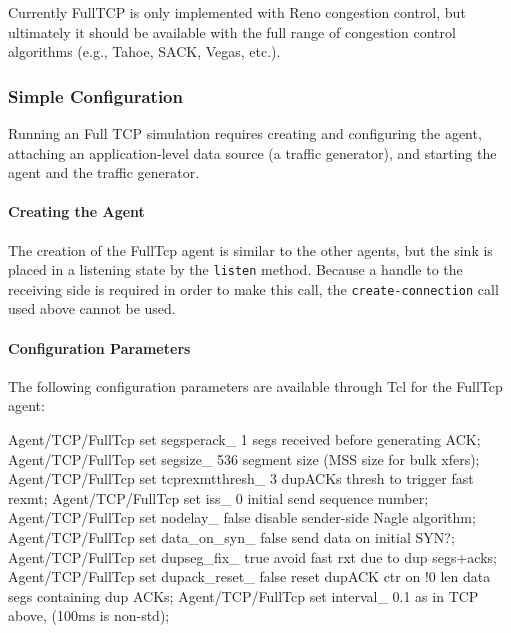 \documentclass{article}
\begin{document}
Currently FullTCP is only implemented with Reno congestion control,
but ultimately it should be available with the full range of
congestion control algorithms (e.g., Tahoe, SACK, Vegas, etc.).


\subsubsection{Simple Configuration}
Running an Full TCP simulation requires
creating and configuring the agent,
attaching an application-level data source (a traffic generator), and
starting the agent and the traffic generator.

\paragraph{Creating the Agent}

The creation of the FullTcp agent is similar to the other agents,
but the sink is placed in a listening state by the {\tt listen} method.
Because a handle to the receiving side is required in order to make
this call, the {\tt create-connection} call used above cannot be used.

\paragraph{Configuration Parameters}
The following configuration parameters are available through Tcl
for the FullTcp agent:
\begin{program}
Agent/TCP/FullTcp set segsperack_ 1 \; segs received before generating ACK;
Agent/TCP/FullTcp set segsize_ 536  \; segment size (MSS size for bulk xfers);
Agent/TCP/FullTcp set tcprexmtthresh_ 3 \; dupACKs thresh to trigger fast rexmt;
Agent/TCP/FullTcp set iss_ 0 \; initial send sequence number;
Agent/TCP/FullTcp set nodelay_ false \; disable sender-side Nagle algorithm;
Agent/TCP/FullTcp set data_on_syn_ false \; send data on initial SYN?;
Agent/TCP/FullTcp set dupseg_fix_ true \; avoid fast rxt due to dup segs+acks;
Agent/TCP/FullTcp set dupack_reset_ false \; reset dupACK ctr on !0 len data segs containing dup ACKs;
Agent/TCP/FullTcp set interval_ 0.1 \; as in TCP above, (100ms is non-std);
\end{program}
\end{document}
